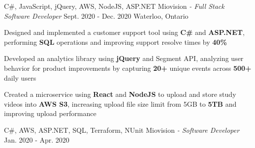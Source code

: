 \begin{siderules}
  \begin{cventries}
    \cventry
    {C\#, JavaScript, jQuery, AWS, NodeJS, ASP.NET}
    {Miovision\hspace{0.15em} \bodyfontlight\itshape{- Full Stack Software Developer}}
    {Sept. 2020 - Dec. 2020}
    {Waterloo, Ontario}
    {
      \begin{cvitems}
        \item{Designed and implemented a customer support tool using \textbf{C\#} and \textbf{ASP.NET}, performing \textbf{SQL} operations and improving support resolve times by \textbf{40\%} }
        \item{Developed an analytics library using \textbf{jQuery} and Segment API, analyzing user behavior for product improvements by capturing \textbf{20+} unique events across \textbf{500+} daily users}
        \item {Created a microservice using \textbf{React} and \textbf{NodeJS} to upload and store study videos into \textbf{AWS S3}, increasing upload file size limit from 5GB to \textbf{5TB} and improving upload performance }
      \end{cvitems}
    }
    \cventry
    {C\#, AWS, ASP.NET, SQL, Terraform, NUnit}
    {Miovision\hspace{0.15em} \bodyfontlight\itshape{- Software Developer}}
    {Jan. 2020 - Apr. 2020}

\end{cventries}
\end{siderules}
